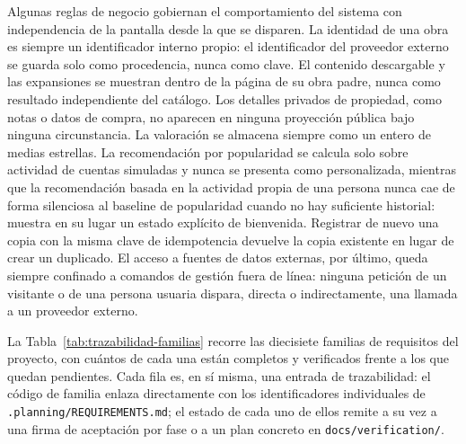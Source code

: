 Algunas reglas de negocio gobiernan el comportamiento del sistema con independencia de la
pantalla desde la que se disparen. La identidad de una obra es siempre un identificador
interno propio: el identificador del proveedor externo se guarda solo como procedencia, nunca
como clave. El contenido descargable y las expansiones se muestran dentro de la página de su
obra padre, nunca como resultado independiente del catálogo. Los detalles privados de
propiedad, como notas o datos de compra, no aparecen en ninguna proyección pública bajo
ninguna circunstancia. La valoración se almacena siempre como un entero de medias estrellas.
La recomendación por popularidad se calcula solo sobre actividad de cuentas simuladas y nunca
se presenta como personalizada, mientras que la recomendación basada en la actividad propia de
una persona nunca cae de forma silenciosa al baseline de popularidad cuando no hay suficiente
historial: muestra en su lugar un estado explícito de bienvenida. Registrar de nuevo una copia
con la misma clave de idempotencia devuelve la copia existente en lugar de crear un duplicado.
El acceso a fuentes de datos externas, por último, queda siempre confinado a comandos de
gestión fuera de línea: ninguna petición de un visitante o de una persona usuaria dispara,
directa o indirectamente, una llamada a un proveedor externo.

La Tabla~\ref{tab:trazabilidad-familias} recorre las diecisiete familias de requisitos del
proyecto, con cuántos de cada una están completos y verificados frente a los que quedan
pendientes. Cada fila es, en sí misma, una entrada de trazabilidad: el código de familia enlaza
directamente con los identificadores individuales de \texttt{.planning/REQUIREMENTS.md}; el
estado de cada uno de ellos remite a su vez a una firma de aceptación por fase o a un plan
concreto en \texttt{docs/verification/}.

